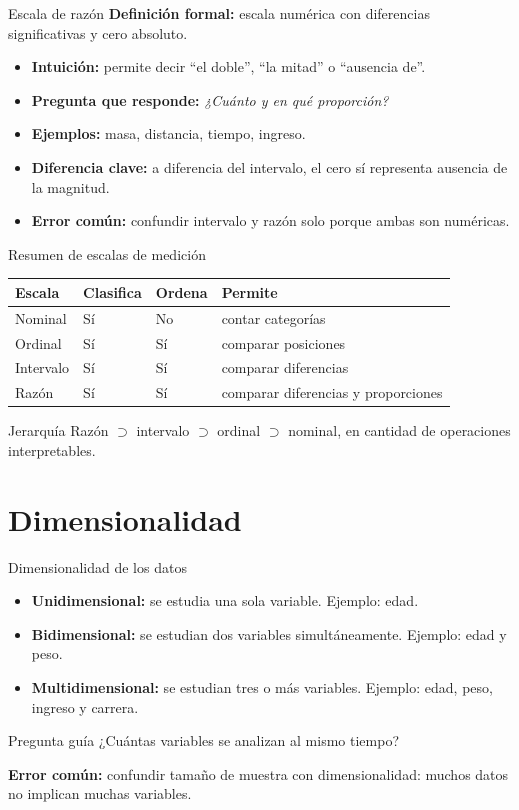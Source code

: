 \documentclass[aspectratio=169,11pt]{beamer}
\newcommand{\pregunta}[1]{\textbf{Pregunta que responde:} \emph{#1}}
\newcommand{\errorcomun}[1]{\textbf{Error común:} #1}
\newcommand{\diferencia}[1]{\textbf{Diferencia clave:} #1}
\begin{document}
\begin{frame}{Escala de razón}
\textbf{Definición formal:} escala numérica con diferencias significativas y cero absoluto.
\begin{itemize}
  \item \textbf{Intuición:} permite decir ``el doble'', ``la mitad'' o ``ausencia de''.
  \item \pregunta{¿Cuánto y en qué proporción?}
  \item \textbf{Ejemplos:} masa, distancia, tiempo, ingreso.
  \item \diferencia{a diferencia del intervalo, el cero sí representa ausencia de la magnitud.}
  \item \errorcomun{confundir intervalo y razón solo porque ambas son numéricas.}
\end{itemize}
\end{frame}

\begin{frame}{Resumen de escalas de medición}
\centering
\begin{tabular}{p{}p{}p{}p{}}
\toprule
Escala & Clasifica & Ordena & Permite \\
\midrule
Nominal & Sí & No & contar categorías \\
Ordinal & Sí & Sí & comparar posiciones \\
Intervalo & Sí & Sí & comparar diferencias \\
Razón & Sí & Sí & comparar diferencias y proporciones \\
\bottomrule
\end{tabular}
\vspace{0.6em}
\begin{block}{Jerarquía}
Razón $\supset$ intervalo $\supset$ ordinal $\supset$ nominal, en cantidad de operaciones interpretables.
\end{block}
\end{frame}

\section{Dimensionalidad}

\begin{frame}{Dimensionalidad de los datos}
\begin{itemize}
  \item \textbf{Unidimensional:} se estudia una sola variable. Ejemplo: edad.
  \item \textbf{Bidimensional:} se estudian dos variables simultáneamente. Ejemplo: edad y peso.
  \item \textbf{Multidimensional:} se estudian tres o más variables. Ejemplo: edad, peso, ingreso y carrera.
\end{itemize}
\begin{block}{Pregunta guía}
¿Cuántas variables se analizan al mismo tiempo?
\end{block}
\errorcomun{confundir tamaño de muestra con dimensionalidad: muchos datos no implican muchas variables.}
\end{frame}
\end{document}
